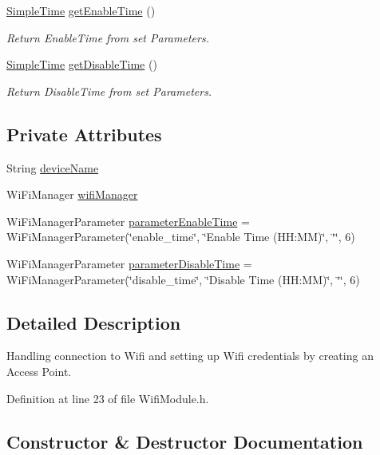 \begin{DoxyCompactItemize}
\mbox{\hyperlink{class_simple_time}{Simple\+Time}} \mbox{\hyperlink{class_wifi_module_a1082a8799fe84e825520a61ee048da46}{get\+Enable\+Time}} ()
\begin{DoxyCompactList}\small\item\em Return Enable\+Time from set Parameters. \end{DoxyCompactList}\item 
\mbox{\hyperlink{class_simple_time}{Simple\+Time}} \mbox{\hyperlink{class_wifi_module_ae43e1f85630c40920fa87c12de0d8e1e}{get\+Disable\+Time}} ()
\begin{DoxyCompactList}\small\item\em Return Disable\+Time from set Parameters. \end{DoxyCompactList}\end{DoxyCompactItemize}
\subsection*{Private Attributes}
\begin{DoxyCompactItemize}
\item 
String \mbox{\hyperlink{class_wifi_module_a5887fc96e71a65413c0e8645c8947e17}{device\+Name}}
\item 
Wi\+Fi\+Manager \mbox{\hyperlink{class_wifi_module_ad569429d746a3db2fe153e4cf063a07d}{wifi\+Manager}}
\item 
Wi\+Fi\+Manager\+Parameter \mbox{\hyperlink{class_wifi_module_ad138f4478faab934496f1b5679298261}{parameter\+Enable\+Time}} = Wi\+Fi\+Manager\+Parameter(\char`\"{}enable\+\_\+time\char`\"{}, \char`\"{}Enable Time (H\+H\+:\+MM)\char`\"{}, \char`\"{}\char`\"{}, 6)
\item 
Wi\+Fi\+Manager\+Parameter \mbox{\hyperlink{class_wifi_module_a8b457a11d91c9f4a5f88a4087580f8b8}{parameter\+Disable\+Time}} = Wi\+Fi\+Manager\+Parameter(\char`\"{}disable\+\_\+time\char`\"{}, \char`\"{}Disable Time (H\+H\+:\+MM)\char`\"{}, \char`\"{}\char`\"{}, 6)
\end{DoxyCompactItemize}


\subsection{Detailed Description}
Handling connection to Wifi and setting up Wifi credentials by creating an Access Point. 

Definition at line 23 of file Wifi\+Module.\+h.



\subsection{Constructor \& Destructor Documentation}
\mbox{\label{class_wifi_module_a1fad662191ce40056868f0a21d0b1ef0}} 
